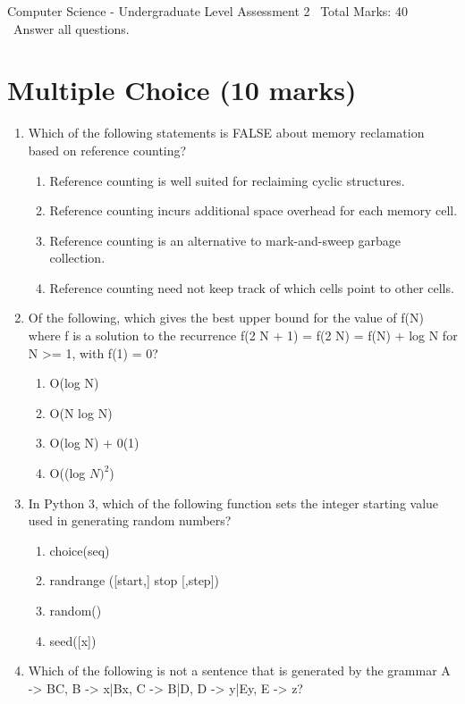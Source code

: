 \documentclass[12pt]{article}
\begin{document}
\begin{center}
Computer Science - Undergraduate Level Assessment 2 \
Total Marks: 40 \
Answer all questions.
\end{center}

\section*{Multiple Choice (10 marks)}
\begin{enumerate}[label=\arabic*.]
\item Which of the following statements is FALSE about memory reclamation based on reference counting?
\begin{enumerate}[label=(\alph*)]
    \item Reference counting is well suited for reclaiming cyclic structures.
    \item Reference counting incurs additional space overhead for each memory cell.
    \item Reference counting is an alternative to mark-and-sweep garbage collection.
    \item Reference counting need not keep track of which cells point to other cells.
\end{enumerate}
\item Of the following, which gives the best upper bound for the value of f(N) where f is a solution to the recurrence f(2 N + 1) = f(2 N) = f(N) + log N for N \textgreater{}= 1, with f(1) = 0?
\begin{enumerate}[label=(\alph*)]
    \item O(log N)
    \item O(N log N)
    \item O(log N) + 0(1)
    \item O((log $N)^2$)
\end{enumerate}
\item In Python 3, which of the following function sets the integer starting value used in generating random numbers?
\begin{enumerate}[label=(\alph*)]
    \item choice(seq)
    \item randrange ([start,] stop [,step])
    \item random()
    \item seed([x])
\end{enumerate}
\item Which of the following is not a sentence that is generated by the grammar A -\textgreater{} BC, B -\textgreater{} x|Bx, C -\textgreater{} B|D, D -\textgreater{} y|Ey, E -\textgreater{} z?

\end{enumerate}
\end{document}
